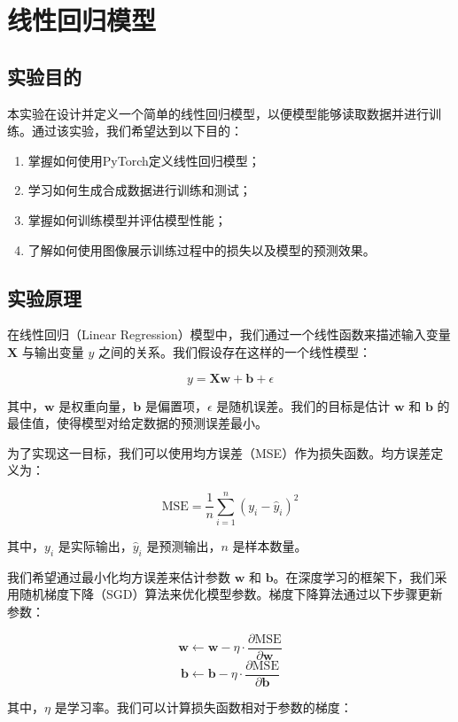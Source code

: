 \documentclass[a4paper,12pt]{article}
\begin{document}
\section{线性回归模型}
\subsection{实验目的}
本实验在设计并定义一个简单的线性回归模型，以便模型能够读取数据并进行训练。通过该实验，我们希望达到以下目的：
\begin{enumerate}
	\item 掌握如何使用PyTorch定义线性回归模型；
	\item 学习如何生成合成数据进行训练和测试；
	\item 掌握如何训练模型并评估模型性能；
	\item 了解如何使用图像展示训练过程中的损失以及模型的预测效果。
\end{enumerate}

\subsection{实验原理}
在线性回归（Linear Regression）模型中，我们通过一个线性函数来描述输入变量 \(\mathbf{X}\) 与输出变量 \(y\) 之间的关系。我们假设存在这样的一个线性模型：

\[
\boxed{
	y = \mathbf{X} \mathbf{w} + \mathbf{b} + \epsilon
}
\]

其中，\(\mathbf{w}\) 是权重向量，\(\mathbf{b}\) 是偏置项，\(\epsilon\) 是随机误差。我们的目标是估计 \(\mathbf{w}\) 和 \(\mathbf{b}\) 的最佳值，使得模型对给定数据的预测误差最小。

为了实现这一目标，我们可以使用均方误差（MSE）作为损失函数。均方误差定义为：

\[
\boxed{
	\mathrm{MSE} = \frac{1}{n} \sum_{i=1}^n \left(y_i - \hat{y}_i\right)^2
}
\]

其中，\(y_i\) 是实际输出，\(\hat{y}_i\) 是预测输出，\(n\) 是样本数量。

我们希望通过最小化均方误差来估计参数 \(\mathbf{w}\) 和 \(\mathbf{b}\)。在深度学习的框架下，我们采用随机梯度下降（SGD）算法来优化模型参数。梯度下降算法通过以下步骤更新参数：

\[
\boxed{
	\mathbf{w} \leftarrow \mathbf{w} - \eta \cdot \frac{\partial \mathrm{MSE}}{\partial \mathbf{w}}
}
\]
\[
\boxed{
	\mathbf{b} \leftarrow \mathbf{b} - \eta \cdot \frac{\partial \mathrm{MSE}}{\partial \mathbf{b}}
}
\]

其中，\(\eta\) 是学习率。我们可以计算损失函数相对于参数的梯度：
\end{document}
